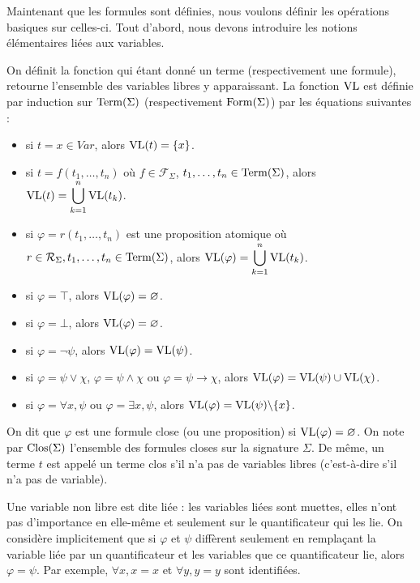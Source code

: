 Maintenant que les formules sont définies, nous voulons définir les opérations
basiques sur celles-ci. Tout d'abord, nous devons introduire les notions
élémentaires liées aux variables.

\begin{definition}
  On définit la fonction qui étant donné un terme (respectivement une formule),
  retourne l'ensemble des variables libres y apparaissant. La fonction $\operatorname{VL}$ est
  définie par induction sur $\operatorname{Term}(\Sigma)$ (respectivement $\operatorname{Form}(\Sigma)$)
  par les équations suivantes :
  \begin{itemize}
  \item si $t = x\in Var$, alors $\operatorname{VL}(t) = \{x\}$.
  \item si $t = f(t_1,\ldots,t_n)$ où $f\in \mathcal F_\Sigma$,
    $t_1,\ldots,t_n\in\operatorname{Term}(\Sigma)$, alors
    $\displaystyle\operatorname{VL}(t) =\bigcup_{k = 1}^n \operatorname{VL}(t_k)$.
  \item si $\varphi = r(t_1,\ldots,t_n)$ est une proposition atomique où
    $r\in\mathcal R_\Sigma, t_1,\ldots,t_n\in\operatorname{Term}(\Sigma)$, alors
    $\displaystyle\operatorname{VL}(\varphi) = \bigcup_{k = 1}^n \operatorname{VL}(t_k)$.
  \item si $\varphi = \top$, alors $\operatorname{VL}(\varphi) = \varnothing$.
  \item si $\varphi = \bot$, alors $\operatorname{VL}(\varphi) = \varnothing$.
  \item si $\varphi = \lnot \psi$, alors $\operatorname{VL}(\varphi) = \operatorname{VL}(\psi)$.
  \item si $\varphi = \psi\lor\chi$, $\varphi = \psi\land \chi$ ou
    $\varphi = \psi\to\chi$, alors $\operatorname{VL}(\varphi) = \operatorname{VL}(\psi)\cup\operatorname{VL}(\chi)$.
  \item si $\varphi = \forall x, \psi$ ou $\varphi = \exists x, \psi$, alors
    $\operatorname{VL}(\varphi) = \operatorname{VL}(\psi)\backslash\{x\}$.
  \end{itemize}
  On dit que $\varphi$ est une formule close (ou une proposition) si
  $\operatorname{VL}(\varphi) =\varnothing$. On note par $\operatorname{Clos}(\Sigma)$ l'ensemble des
  formules closes sur la signature $\Sigma$. De même, un terme $t$ est appelé un
  terme clos s'il n'a pas de variables libres (c'est-à-dire s'il n'a pas de
  variable).
\end{definition}

\begin{remark}\label{rmk.alpha}
  Une variable non libre est dite liée : les variables liées sont muettes, elles
  n'ont pas d'importance en elle-même et seulement sur le quantificateur qui les
  lie. On considère implicitement que si $\varphi$ et $\psi$ diffèrent seulement
  en remplaçant la variable liée par un quantificateur et les variables que ce
  quantificateur lie, alors $\varphi = \psi$. Par exemple, $\forall x, x = x$ et
  $\forall y, y = y$ sont identifiées.
\end{remark}

